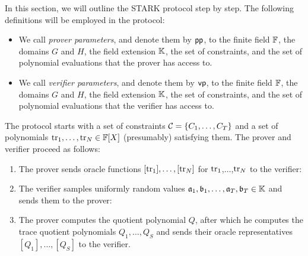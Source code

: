In this section, we will outline the STARK protocol step by step. The following definitions will be employed in the protocol:
\begin{itemize}
  \item We call \textit{prover parameters}, and denote them by $\textsf{pp}$, to the finite field $\mathbb{F}$, the domains $G$ and $H$, the field extension $\mathbb{K}$, the set of constraints, and the set of polynomial evaluations that the prover has access to.
  \item We call \textit{verifier parameters}, and denote them by $\textsf{vp}$, to the finite field $\mathbb{F}$, the domains $G$ and $H$, the field extension $\mathbb{K}$, the set of constraints, and the set of polynomial evaluations that the verifier has access to.
\end{itemize}
\begin{protocol}
The protocol starts with a set of constraints $\mathcal{C} = \left\{C_1,\dots,C_T\right\}$ and a set of polynomials $\text{tr}_1,\dots,\text{tr}_N \in \mathbb{F}[X]$ (presumably) satisfying them. The prover and verifier proceed as follows:
\begin{enumerate}
  \item The prover sends oracle functions $[\text{tr}_1],\dots,[\text{tr}_N]$ for $\text{tr}_1$,$\dots$,$\text{tr}_N$ to the verifier:

  \item The verifier samples uniformly random values $\mathfrak{a}_1,\mathfrak{b}_1,\dots,\mathfrak{a}_T,\mathfrak{b}_T \in \mathbb{K}$ and sends them to the prover:

  \item The prover computes the quotient polynomial $Q$, after which he computes the trace quotient polynomials $Q_1,\dots,Q_S$ and sends their oracle representatives $[Q_1],\dots,[Q_S]$ to the verifier.
  

\end{enumerate}
\end{protocol}
